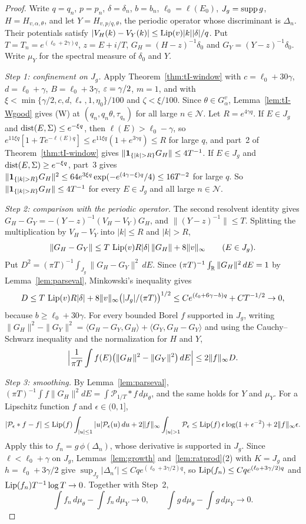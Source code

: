 \begin{proof}
Write $q=q_n$, $p=p_n$, $\delta=\delta_n$, $b=b_n$, $\ell_0=\ell(E_0)$, $J_g=\operatorname{supp} g$, $H=H_{v,\alpha,\theta}$, and let $Y=H_{v,p/q,\theta}$, the periodic operator whose discriminant is $\Delta_n$. Their potentials satisfy $|V_H(k)-V_Y(k)|\le\operatorname{Lip}(v)|k||\delta|/q$. Put $T=T_n=e^{(\ell_0+2\gamma)q}$, $z=E+i/T$, $G_H=(H-z)^{-1}\delta_0$ and $G_Y=(Y-z)^{-1}\delta_0$. Write $\mu_Y$ for the spectral measure of $\delta_0$ and $Y$.

\emph{Step 1: confinement on $J_g$.} Apply Theorem~\ref{thm:tI-window} with $c=\ell_0+30\gamma$, $d=\ell_0+\gamma$, $B=\ell_0+3\gamma$, $\varepsilon=\gamma/2$, $m=1$, and with $\xi<\min\{\gamma/2,c,d,\ell_*,1,\eta_0\}/100$ and $\zeta<\xi/100$. Since $\theta\in G^v_\alpha$, Lemma~\ref{lem:tI-Wgood} gives (W) at $(q_n,q_n\theta,\tau_{q_n})$ for all large $n\in\mathcal N$. Let $R=e^{4\gamma q}$. If $E\in J_g$ and $\operatorname{dist}(E,\Sigma)\le e^{-\xi q}$, then $\ell(E)>\ell_0-\gamma$, so $e^{11\xi q}[1+Te^{-\ell(E)q}]\le e^{11\xi q}(1+e^{3\gamma q})\le R$ for large $q$, and part~2 of Theorem~\ref{thm:tI-window} gives $\|\un_{\{|k|>R\}}G_H\|\le4T^{-1}$. If $E\in J_g$ and $\operatorname{dist}(E,\Sigma)\ge e^{-\xi q}$, part~3 gives $\|\un_{\{|k|>R\}}G_H\|^2\le64e^{3\xi q}\exp(-e^{(4\gamma-\xi)q}/4)\le16T^{-2}$ for large $q$. So $\|\un_{\{|k|>R\}}G_H\|\le4T^{-1}$ for every $E\in J_g$ and all large $n\in\mathcal N$.

\emph{Step 2: comparison with the periodic operator.} The second resolvent identity gives $G_H-G_Y=-(Y-z)^{-1}(V_H-V_Y)G_H$, and $\|(Y-z)^{-1}\|\le T$. Splitting the multiplication by $V_H-V_Y$ into $|k|\le R$ and $|k|>R$,
\[
\|G_H-G_Y\|\le T\,\operatorname{Lip}(v)R|\delta|\,\|G_H\|+8\|v\|_\infty\qquad(E\in J_g).
\]
Put $D^2=(\pi T)^{-1}\int_{J_g}\|G_H-G_Y\|^2\,dE$. Since $(\pi T)^{-1}\int_\mathbb R\|G_H\|^2\,dE=1$ by Lemma~\ref{lem:parseval}, Minkowski's inequality gives
\[
D\le T\,\operatorname{Lip}(v)R|\delta|+8\|v\|_\infty\bigl(|J_g|/(\pi T)\bigr)^{1/2}\le Ce^{(\ell_0+6\gamma-b)q}+CT^{-1/2}\to0,
\]
because $b\ge\ell_0+30\gamma$. For every bounded Borel $f$ supported in $J_g$, writing $\|G_H\|^2-\|G_Y\|^2=\langle G_H-G_Y,G_H\rangle+\langle G_Y,G_H-G_Y\rangle$ and using the Cauchy--Schwarz inequality and the normalization for $H$ and $Y$,
\[
\Bigl|\frac1{\pi T}\int f(E)\bigl(\|G_H\|^2-\|G_Y\|^2\bigr)\,dE\Bigr|\le2\|f\|_\infty D.
\]

\emph{Step 3: smoothing.} By Lemma~\ref{lem:parseval}, $(\pi T)^{-1}\int f\|G_H\|^2dE=\int\mathcal P_{1/T}*f\,d\mu_\theta$, and the same holds for $Y$ and $\mu_Y$. For a Lipschitz function $f$ and $\epsilon\in(0,1]$,
\[
|\mathcal P_\epsilon*f-f|\le\Lip(f)\int_{|u|\le1}|u|\mathcal P_\epsilon(u)\,du+2\|f\|_\infty\int_{|u|>1}\mathcal P_\epsilon\le\Lip(f)\,\epsilon\log(1+\epsilon^{-2})+2\|f\|_\infty\epsilon.
\]
Apply this to $f_n=g\,\phi(\Delta_n)$, whose derivative is supported in $J_g$. Since $\ell<\ell_0+\gamma$ on $J_g$, Lemmas~\ref{lem:growth} and~\ref{lem:ratprod}(2) with $K=J_g$ and $h=\ell_0+3\gamma/2$ give $\sup_{J_g}|\Delta_n'|\le Cqe^{(\ell_0+3\gamma/2)q}$, so $\operatorname{Lip}(f_n)\le Cqe^{(\ell_0+3\gamma/2)q}$ and $\operatorname{Lip}(f_n)T^{-1}\log T\to0$. Together with Step~2,
\[
\int f_n\,d\mu_\theta-\int f_n\,d\mu_Y\to0,\qquad\int g\,d\mu_\theta-\int g\,d\mu_Y\to0.
\]


\end{proof}
